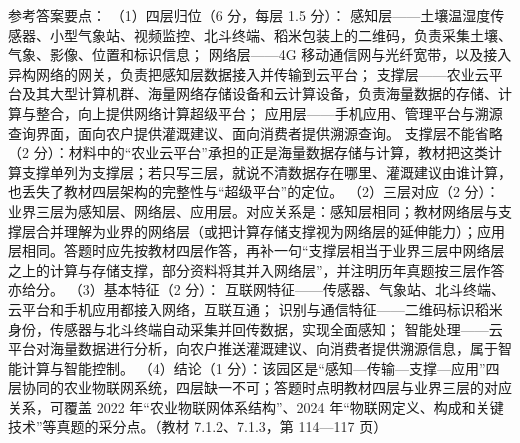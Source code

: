 \documentclass[a4paper,11pt]{article}
\begin{document}
\q 参考答案要点：
（1）四层归位（6 分，每层 1.5 分）：
感知层——土壤温湿度传感器、小型气象站、视频监控、北斗终端、稻米包装上的二维码，负责采集土壤、气象、影像、位置和标识信息；
网络层——4G 移动通信网与光纤宽带，以及接入异构网络的网关，负责把感知层数据接入并传输到云平台；
支撑层——农业云平台及其大型计算机群、海量网络存储设备和云计算设备，负责海量数据的存储、计算与整合，向上提供网络计算超级平台；
应用层——手机应用、管理平台与溯源查询界面，面向农户提供灌溉建议、面向消费者提供溯源查询。
支撑层不能省略（2 分）：材料中的“农业云平台”承担的正是海量数据存储与计算，教材把这类计算支撑单列为支撑层；若只写三层，就说不清数据存在哪里、灌溉建议由谁计算，也丢失了教材四层架构的完整性与“超级平台”的定位。
（2）三层对应（2 分）：业界三层为感知层、网络层、应用层。对应关系是：感知层相同；教材网络层与支撑层合并理解为业界的网络层（或把计算存储支撑视为网络层的延伸能力）；应用层相同。答题时应先按教材四层作答，再补一句“支撑层相当于业界三层中网络层之上的计算与存储支撑，部分资料将其并入网络层”，并注明历年真题按三层作答亦给分。
（3）基本特征（2 分）：
互联网特征——传感器、气象站、北斗终端、云平台和手机应用都接入网络，互联互通；
识别与通信特征——二维码标识稻米身份，传感器与北斗终端自动采集并回传数据，实现全面感知；
智能处理——云平台对海量数据进行分析，向农户推送灌溉建议、向消费者提供溯源信息，属于智能计算与智能控制。
（4）结论（1 分）：该园区是“感知—传输—支撑—应用”四层协同的农业物联网系统，四层缺一不可；答题时点明教材四层与业界三层的对应关系，可覆盖 2022 年“农业物联网体系结构”、2024 年“物联网定义、构成和关键技术”等真题的采分点。（教材 7.1.2、7.1.3，第 114—117 页）
\end{document}
